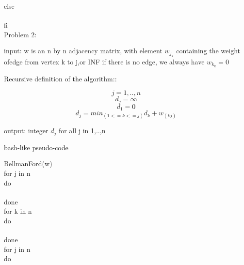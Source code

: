 \documentclass[12pt]{article}
\begin{document}
else\\

\hspace{1cm}{return f2}\\

fi\\

Problem 2:

input:
w  is an n by n adjacency matrix, with element $w_j_k$ containing the weight ofedge from vertex k to j,or INF if there is no edge, we always have $w_k_k = 0$

Recursive definition of the algorithm::

$$j = 1,..,n$$
$$d_j = \infty$$
$$d_1=0$$
$$d_j= min_(1<=k<=j) d_k+w_(kj)$$

output:
integer $d_j$ for all j in 1,..,n

bash-like pseudo-code

BellmanFord(w)\\

for j in n\\

do\\

\hspace{1cm}{d[0,j] = INF}\\

done\\

for k in n\\

do\\

\hspace{1cm}{d[k,k]=0}\\

done\\

for j in n \\

do\\ 

\hspace{1cm}{for k in n}\\ 

\hspace{1cm}{do}\\

\hspace{2cm}{if [w[k,j] $! =$  INF] then}\\

\hspace{3cm}{d[k,j] = d[k-1,j]}\\
\end{document}
